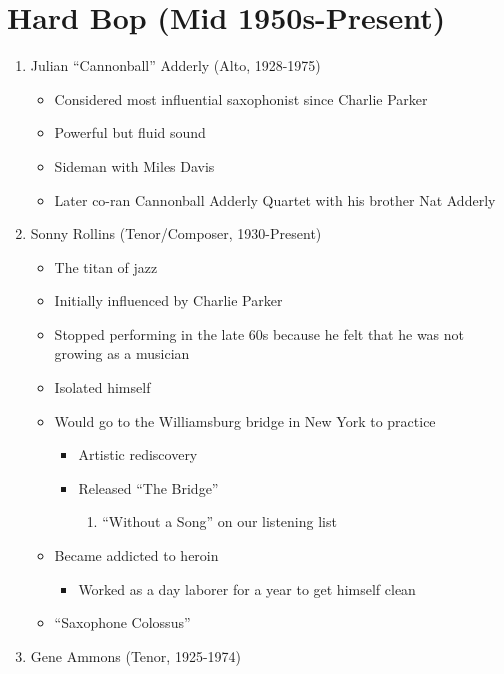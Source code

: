 \documentclass[]{article}
\providecommand{\tightlist}{%
  \setlength{\itemsep}{0pt}\setlength{\parskip}{0pt}}
\begin{document}
\section{Hard Bop (Mid 1950s-Present)}\label{hard-bop-mid-1950s-present}

\begin{enumerate}
\def\labelenumi{\arabic{enumi}.}
\tightlist
\item
  Julian ``Cannonball'' Adderly (Alto, 1928-1975)

  \begin{itemize}
  \tightlist
  \item
    Considered most influential saxophonist since Charlie Parker
  \item
    Powerful but fluid sound
  \item
    Sideman with Miles Davis
  \item
    Later co-ran Cannonball Adderly Quartet with his brother Nat Adderly
  \end{itemize}
\item
  Sonny Rollins (Tenor/Composer, 1930-Present)

  \begin{itemize}
  \tightlist
  \item
    The titan of jazz
  \item
    Initially influenced by Charlie Parker
  \item
    Stopped performing in the late 60s because he felt that he was not
    growing as a musician
  \item
    Isolated himself
  \item
    Would go to the Williamsburg bridge in New York to practice

    \begin{itemize}
    \tightlist
    \item
      Artistic rediscovery
    \item
      Released ``The Bridge''

      \begin{enumerate}
      \def\labelenumii{\roman{enumii}.}
      \tightlist
      \item
        ``Without a Song'' on our listening list
      \end{enumerate}
    \end{itemize}
  \item
    Became addicted to heroin

    \begin{itemize}
    \tightlist
    \item
      Worked as a day laborer for a year to get himself clean
    \end{itemize}
  \item
    ``Saxophone Colossus''
  \end{itemize}
\item
  Gene Ammons (Tenor, 1925-1974)


\end{enumerate}
\end{document}
